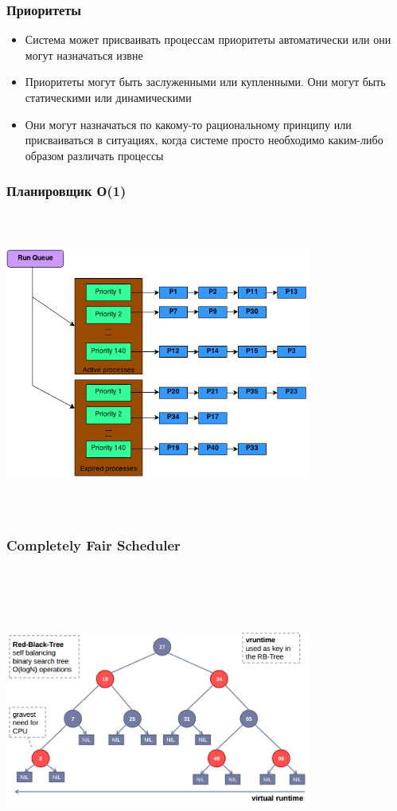 \documentclass[10pt]{beamer}
\begin{document}
\begin{frame}\frametitle{Приоритеты}
\begin{itemize}
\item Система может присваивать процессам приоритеты автоматически или они могут назначаться извне \item Приоритеты могут быть заслуженными или купленными. Они могут быть статическими или динамическими
\item Они могут назначаться по какому-то рациональному принципу или присваиваться в ситуациях, когда системе просто необходимо каким-либо образом различать процессы
\end{itemize}
\end{frame}

\begin{frame}\frametitle{Планировщик О(1)}
\center
\includegraphics[width=10cm, height=10cm,keepaspectratio]{sched4}
\end{frame}

\begin{frame}\frametitle{Completely Fair Scheduler}
\center
\includegraphics[width=10cm, height=10cm,keepaspectratio]{sched5}
\end{frame}
\end{document}
